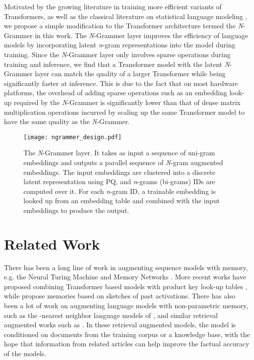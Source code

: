\documentclass[11pt]{article}
\newcommand{\minisection}[1]{\noindent{\bf #1}\nobreak}
\begin{document}
Motivated by the growing literature in training more efficient variants of Transformers, as well as the
classical literature on statistical language modeling \citep{koehn2009statistical},
we propose a simple modification to the Transformer architecture termed the \textit{N}-Grammer in this work.
The \textit{N}-Grammer layer improves the efficiency of language models by incorporating latent 
\textit{n}-gram representations into the model during training. Since the \textit{N}-Grammer layer only 
involves sparse operations during training and inference, we find that a Transformer model with the latent \textit{N}-Grammer layer can match the quality of a larger Transformer while being significantly faster at inference. This is due to the fact that on most hardware platforms,
the overhead of adding sparse operations such as an embedding look-up
required by the \textit{N}-Grammer is significantly lower
than that of dense matrix multiplication operations incurred by
scaling up the same Transformer model to have the same quality as the \textit{N}-Grammer.

\begin{figure*}[th!]
\centering
\texttt{[image: ngrammer\_design.pdf]}
\caption{The \textit{N}-Grammer layer. It takes as input a 
sequence of uni-gram embeddings and outputs a parallel sequence 
of \textit{N}-gram augmented embeddings. The input embeddings are 
clustered into a discrete latent representation using PQ,
and \textit{n}-grams (bi-grams) IDs are computed over it. 
For each \textit{n}-gram ID, a trainable embedding is looked up 
from an embedding table and combined with 
the input embeddings to produce the output. }\label{fig:ngrammer}
\end{figure*}

\section{Related Work}
\minisection{Memory augmented models}
There has been a long line of work in augmenting sequence models with memory, e.g. the
Neural Turing Machine \citep{graves2014neural} and Memory Networks \citep{weston2014memory}. 
More recent works have proposed 
combining Transformer based models with product key look-up tables \citep{lample2019large},
while \citet{panigrahy2021sketch} propose memories based on sketches of past activations.
There has also been a lot of work on augmenting language models with non-parametric memory,
such as the -nearest neighbor language models of \citet{khandelwal2019generalization},
and similar retrieval augmented works such as 
\citet{lewis2020retrieval,guu2020realm,krishna2021hurdles}. 
In these retrieval augmented models, 
the model is conditioned on documents from the training corpus
or a knowledge base, with the hope that information from related articles 
can help improve the factual accuracy of the models.
\end{document}
